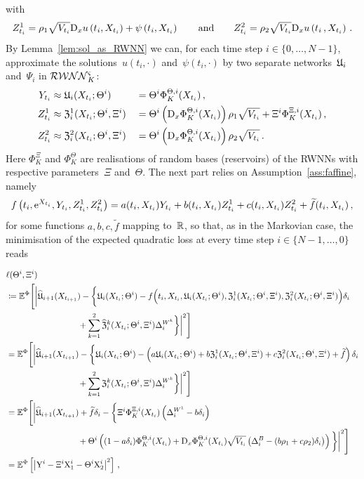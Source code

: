 with
$$
Z^1_{t_i}  = \rho_1 \sqrt{V_{t_{i}}} \mathrm{D}_{x} u\left({t_{i}}, X_{t_{i}}\right) + \psi\left({t_{i}}, X_{t_{i}}\right)
\qquad\text{and}\qquad
Z^2_{t_i}  = \rho_2\sqrt{V_{t_{i}}} \mathrm{D}_{x} u\left({t_{i}}\,, X_{t_{i}}\right)\,.
$$
By Lemma~\ref{lem:sol_as_RWNN} we can, for each time step $i\in\{0, \dots, N-1\}$, approximate the solutions~$u(t_i,\cdot)$ and~$\psi(t_i,\cdot)$ by two separate networks~$\mathfrak{U}_i$ and~$\Psi_i$ in $\mathcal{RWNN}_K^{\varsigma}$: 
\begin{alignat*}{3}
    Y_{t_i} &\approx \mathfrak{U}_i(X_{t_i}; \Theta^i) && = \Theta^i \Phi^{\Theta,i}_K(X_{t_i})\,, \\
    Z^1_{t_i} &\approx \mathfrak{Z}^1_i(X_{t_i}; \Theta^i, \Xi^i) && = \Theta^i \left(\mathrm{D}_{x} \Phi_K^{\Theta,i}(X_{t_i})\right) \rho_1\sqrt{V_{t_i}} + \Xi^i\Phi^{\Xi,i}_K(X_{t_i})\,, \\
    Z^2_{t_i} &\approx \mathfrak{Z}^2_i(X_{t_i}; \Theta^i, \Xi^i) && = \Theta^i \left(\mathrm{D}_{x} \Phi_K^{\Theta,i}(X_{t_i})\right) \rho_2\sqrt{V_{t_i}}\,.
\end{alignat*}
Here $\Phi_K^\Xi$ and $\Phi_K^\Theta$ are realisations of random bases (reservoirs) of the RWNNs with respective parameters~$\Xi$ and~$\Theta$. 
The next part relies on Assumption~\ref{ass:faffine}, namely
$$
f\left(t_i, \mathrm{e}^{X_{t_{i}}},  Y_{t_i},  Z^1_{t_i},  Z^2_{t_i}\right) = a(t_i,X_{t_i}) Y_{t_i} + b(t_i,X_{t_i}) Z^1_{t_i} + c(t_i,X_{t_i}) Z^2_{t_i} + \widetilde{f}(t_i,X_{t_i})\,,
$$
for some functions $a,b,c,\widetilde{f}$ mapping to~$\mathbb{R}$, so that, as in the Markovian case, the minimisation of the expected quadratic loss at every time step $i\in\{N-1,\dots,0\}$ reads
\begin{small}
\begin{align*}
    &\ell(\Theta^i, \Xi^i) \\ &\defEqual \EE^\Phi\Bigg[\bigg|\widehat\Uf_{i+1}(X_{t_{i+1}})-\bigg\{\Uf_i(X_{t_i}; \Theta^i)-f\Big(t_{i}, X_{t_{i}}, \Uf_i(X_{t_i}; \Theta^i), \Zf^1_i(X_{t_i}; \Theta^i, \Xi^i), \Zf^2_i(X_{t_i}; \Theta^i, \Xi^i)\Big)\Deli \\
    & \hspace{3cm} + \sum_{k=1}^2\widehat \Zf^k_i(X_{t_i}; \Theta^i, \Xi^i)\Delta^{W^k}_{i}\bigg\}\bigg|^2\Bigg] \\
    &= \EE^\Phi\Bigg[\bigg|\widehat\Uf_{i+1}(X_{t_{i+1}})-\bigg\{\Uf_i(X_{t_i}; \Theta^i)-\left(a\Uf_i(X_{t_i}; \Theta^i) + b\Zf^1_i(X_{t_i}; \Theta^i, \Xi^i) + c\Zf^2_i(X_{t_i}; \Theta^i, \Xi^i) + \widetilde{f}\right)\Deli \\
    & \hspace{3cm} + \sum_{k=1}^2\Zf^k_i(X_{t_i}; \Theta^i, \Xi^i)\Delta^{W^k}_{i}\bigg\}\bigg|^2\Bigg] \\
    &= \EE^\Phi\Bigg[\bigg|\widehat\Uf_{i+1}(X_{t_{i+1}}) + \widetilde{f}\Deli  - \bigg\{ \Xi^i\Phi_K^{\Xi,i}(X_{t_i})\left(\Delta^{W^1}_{i}-b\Deli \right) \\
    & \hspace{3cm} + \Theta^i\left((1-a\Deli )\Phi_K^{\Theta,i}(X_{t_i}) + \Dx\Phi_K^{\Theta,i}(X_{t_i})\sqrt{V_{t_i}}\left(\Delta^{B}_{i} - (b\rho_1 + c\rho_2)\Deli \right) \right) \bigg\}\bigg|^2\Bigg] \\
    &= \EE^\Phi\left[\left|\Y^i - \Xi^i \X_1^i -
    \Theta^i\X_2^i \right|^2\right]\,,
\end{align*}
\end{small}%
